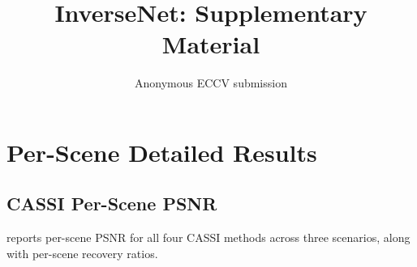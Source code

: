 \documentclass[runningheads]{llncs}
\begin{document}
\title{InverseNet: Supplementary Material}
\author{Anonymous ECCV submission}
\maketitle

\section{Per-Scene Detailed Results}
\label{sec:per_scene}

\subsection{CASSI Per-Scene PSNR}

 reports per-scene PSNR for all four CASSI methods across three scenarios, along with per-scene recovery ratios.
\end{document}
